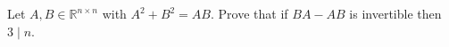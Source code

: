 Let \(A,B \in \mathbb{R}^{n\times n}\) with \(A^2+B^2=AB\). Prove that if \(BA-AB\) is invertible then \(3 \mid n\).